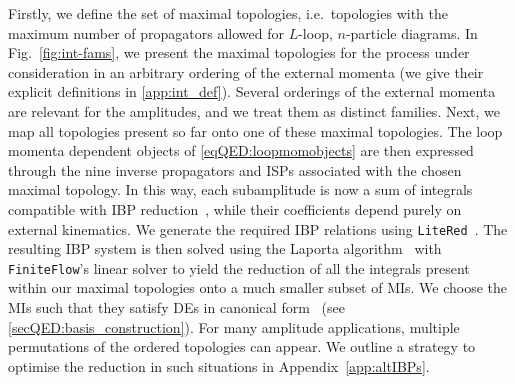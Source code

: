 \documentclass[main.tex]{subfiles}
\begin{document}
Firstly, we define the set of maximal topologies, i.e.~topologies with the maximum number of propagators allowed for $L$-loop, $n$-particle diagrams. In Fig.~\ref{fig:int-fams}, we present the maximal topologies for the process under consideration in an arbitrary ordering of the external momenta (we give their explicit definitions in \cref{app:int_def}). Several orderings of the external momenta are relevant for the amplitudes, and we treat them as distinct families. Next, we map all topologies present so far onto one of these maximal topologies. The loop momenta dependent objects of \cref{eqQED:loopmomobjects} are then expressed through the nine inverse propagators and ISPs associated with the chosen maximal topology. In this way, each subamplitude is now a sum of integrals compatible with IBP reduction~\cite{Tkachov:1981wb,Chetyrkin:1981qh}, while their coefficients depend purely on external kinematics. We generate the required IBP relations using \texttt{LiteRed}~\cite{Lee:2012cn}. The resulting IBP system is then solved using the Laporta algorithm~\cite{Laporta:2001dd} with \texttt{FiniteFlow}'s linear solver to yield the reduction of all the integrals present within our maximal topologies onto a much smaller subset of MIs. We choose the MIs such that they satisfy DEs in canonical form~\cite{Henn:2013pwa} (see \cref{secQED:basis_construction}). For many amplitude applications, multiple permutations of the ordered topologies can appear. We outline a strategy to optimise the reduction in such situations in Appendix~\ref{app:altIBPs}.
\end{document}
